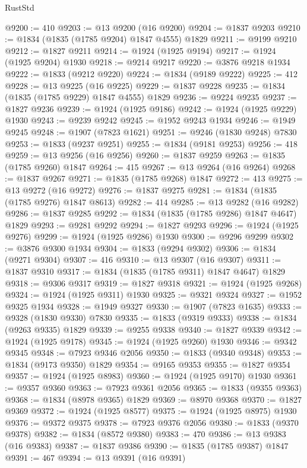 \begin{lexlean}{RustStd}
\begin{coremodule}
{\begin{coremodule}
{{{{{@9200 := 410
@9203 := @13 @9200 (@16 @9200)
@9204 := @1837 @9203
@9210 := @1834 (@1835 (@1785 @9204) @1847 @4555) @1829
@9211 := @9199 @9210
@9212 := @1827 @9211
@9214 := @1924 (@1925 @9194)
@9217 := @1924 (@1925 @9204) @1930
@9218 := @9214 @9217
@9220 := @3876 @9218 @1934
@9222 := @1833 (@9212 @9220)
@9224 := @1834 (@9189 @9222)
@9225 := 412
@9228 := @13 @9225 (@16 @9225)
@9229 := @1837 @9228
@9235 := @1834 (@1835 (@1785 @9229) @1847 @4555) @1829
@9236 := @9224 @9235
@9237 := @1827 @9236
@9239 := @1924 (@1925 @9186)
@9242 := @1924 (@1925 @9229) @1930
@9243 := @9239 @9242
@9245 := @1952 @9243 @1934
@9246 := @1949 @9245
@9248 := @1907 (@7823 @1621)
@9251 := @9246 (@1830 @9248) @7830
@9253 := @1833 (@9237 @9251)
@9255 := @1834 (@9181 @9253)
@9256 := 418
@9259 := @13 @9256 (@16 @9256)
@9260 := @1837 @9259
@9263 := @1835 (@1785 @9260) @1847
@9264 := 415
@9267 := @13 @9264 (@16 @9264)
@9268 := @1837 @9267
@9271 := @1835 (@1785 @9268) @1847
@9272 := 413
@9275 := @13 @9272 (@16 @9272)
@9276 := @1837 @9275
@9281 := @1834 (@1835 (@1785 @9276) @1847 @8613)
@9282 := 414
@9285 := @13 @9282 (@16 @9282)
@9286 := @1837 @9285
@9292 := @1834 (@1835 (@1785 @9286) @1847 @4647) @1829
@9293 := @9281 @9292
@9294 := @1827 @9293
@9296 := @1924 (@1925 @9276)
@9299 := @1924 (@1925 @9286) @1930
@9300 := @9296 @9299
@9302 := @3876 @9300 @1934
@9304 := @1833 (@9294 @9302)
@9306 := @1834 (@9271 @9304)
@9307 := 416
@9310 := @13 @9307 (@16 @9307)
@9311 := @1837 @9310
@9317 := @1834 (@1835 (@1785 @9311) @1847 @4647) @1829
@9318 := @9306 @9317
@9319 := @1827 @9318
@9321 := @1924 (@1925 @9268)
@9324 := @1924 (@1925 @9311) @1930
@9325 := @9321 @9324
@9327 := @1952 @9325 @1934
@9328 := @1949 @9327
@9330 := @1907 (@7823 @1635)
@9333 := @9328 (@1830 @9330) @7830
@9335 := @1833 (@9319 @9333)
@9338 := @1834 (@9263 @9335) @1829
@9339 := @9255 @9338
@9340 := @1827 @9339
@9342 := @1924 (@1925 @9178)
@9345 := @1924 (@1925 @9260) @1930
@9346 := @9342 @9345
@9348 := @7923 @9346 @2056
@9350 := @1833 (@9340 @9348)
@9353 := @1834 (@9173 @9350) @1829
@9354 := @9165 @9353
@9355 := @1827 @9354
@9357 := @1924 (@1925 @8983)
@9360 := @1924 (@1925 @9170) @1930
@9361 := @9357 @9360
@9363 := @7923 @9361 @2056
@9365 := @1833 (@9355 @9363)
@9368 := @1834 (@8978 @9365) @1829
@9369 := @8970 @9368
@9370 := @1827 @9369
@9372 := @1924 (@1925 @8577)
@9375 := @1924 (@1925 @8975) @1930
@9376 := @9372 @9375
@9378 := @7923 @9376 @2056
@9380 := @1833 (@9370 @9378)
@9382 := @1834 (@8572 @9380)
@9383 := 470
@9386 := @13 @9383 (@16 @9383)
@9387 := @1837 @9386
@9390 := @1835 (@1785 @9387) @1847
@9391 := 467
@9394 := @13 @9391 (@16 @9391)
}}}}}
\end{coremodule}}
\end{coremodule}
\end{lexlean}
